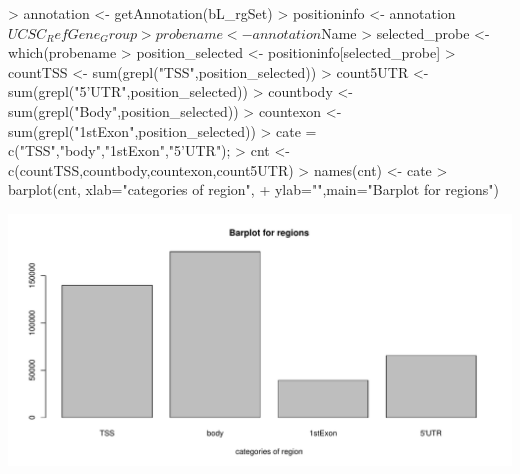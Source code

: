 \documentclass[12pt,a4paper]{paper}
\begin{document}
\begin{enumerate}
\begin{enumerate}
\begin{Schunk}
\begin{Sinput}
> annotation <- getAnnotation(bL_rgSet)
> positioninfo <- annotation$UCSC_RefGene_Group
> probename<-annotation$Name
> selected_probe <- which(probename %
> position_selected <- positioninfo[selected_probe]
> countTSS <- sum(grepl("TSS",position_selected))
> count5UTR <- sum(grepl("5'UTR",position_selected))
> countbody <- sum(grepl("Body",position_selected))
> countexon <- sum(grepl("1stExon",position_selected))
> cate = c("TSS","body","1stExon","5'UTR");
> cnt <- c(countTSS,countbody,countexon,count5UTR)
> names(cnt) <- cate
> barplot(cnt, xlab="categories of region", 
+         ylab="",main="Barplot for regions")
\end{Sinput}
\end{Schunk}
\includegraphics{Osorio_Daniel_HW3-014}


\end{enumerate}
\end{enumerate}
\end{document}
